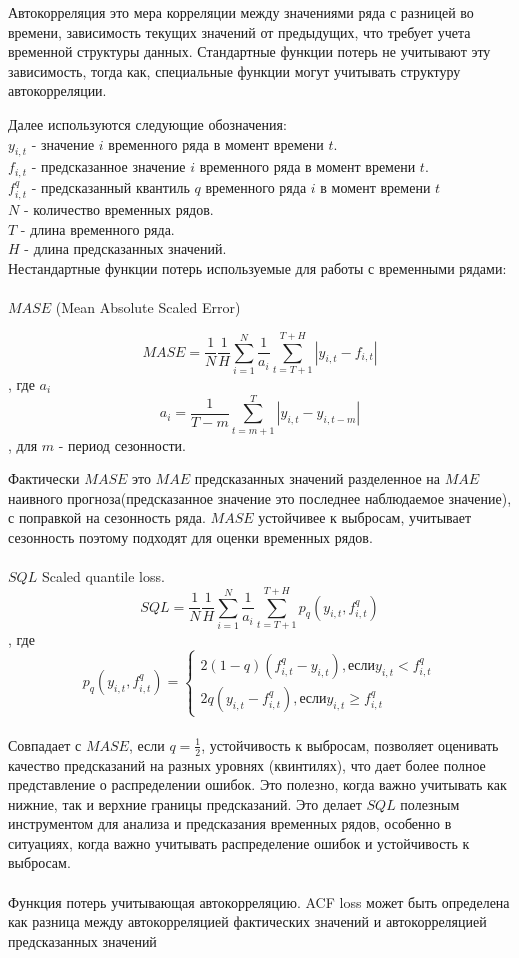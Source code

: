 Автокорреляция это мера корреляции между значениями ряда с разницей во времени, зависимость текущих значений от предыдущих, что требует учета временной структуры данных.
Стандартные функции потерь не учитывают эту зависимость, тогда как, специальные функции могут учитывать структуру автокорреляции.

Далее используются следующие обозначения:\\
$y_{i,t}$ - значение $i$ временного ряда в момент времени $t$.\\
$f_{i,t}$ - предсказанное значение $i$ временного ряда в момент времени $t$.\\
$f_{i,t}^q$ - предсказанный квантиль $q$ временного ряда $i$ в момент времени $t$\\
$N$ - количество временных рядов.\\
$T$ -  длина временного ряда.\\
$H$ - длина предсказанных значений.\\

Нестандартные функции потерь используемые для работы с временными рядами:\\
\\
$MASE$ (Mean Absolute Scaled Error)

$$MASE = \frac{1}{N} \frac{1}{H} \sum_{i = 1}^{N} \frac{1}{a_{i}}\sum_{t = T + 1} ^ {T + H}|y_{i,t} - f_{i,t}| $$ , где $a_{i}$
$$a_{i} = \frac{1}{T - m} \sum_{t = m + 1}^{T}|y_{i,t} - y_{i, t - m}|$$, для $m$ - период сезонности.

Фактически $MASE$ это $MAE$ предсказанных значений разделенное на $MAE$ наивного прогноза(предсказанное значение это последнее наблюдаемое значение), с поправкой на сезонность ряда.
$MASE$ устойчивее к выбросам, учитывает сезонность поэтому подходят для оценки временных рядов.\\
\\
$SQL$ Scaled quantile loss.
$$SQL = \frac{1}{N} \frac{1}{H} \sum_{i = 1}^{N} \frac{1}{a_{i}}\sum_{t = T + 1} ^ {T + H}p_{q}(y_{i,t}, f_{i,t}^{q})$$, где
$$p_{q}(y_{i,t}, f_{i,t}^{q}) = \begin{cases}
    2(1 - q)(f_{i,t}^q - y_{i,t}), если y_{i,t} < f_{i,t}^q\\
    2q(y_{i,t} - f_{i,t}^q ),если y_{i,t} \geq f_{i,t}^q
\end{cases}$$
\\
Совпадает с $MASE$, если $q = \frac{1}{2}$, устойчивость к выбросам, позволяет оценивать качество предсказаний на разных уровнях (квинтилях), что дает более полное представление о распределении ошибок. Это полезно, когда важно учитывать как нижние, так и верхние границы предсказаний. Это делает $SQL$ полезным инструментом для анализа и предсказания временных рядов, особенно в ситуациях, когда важно учитывать распределение ошибок и устойчивость к выбросам.\\
\\
Функция потерь учитывающая автокорреляцию. ACF loss может быть определена как разница между автокорреляцией фактических значений и автокорреляцией предсказанных значений

